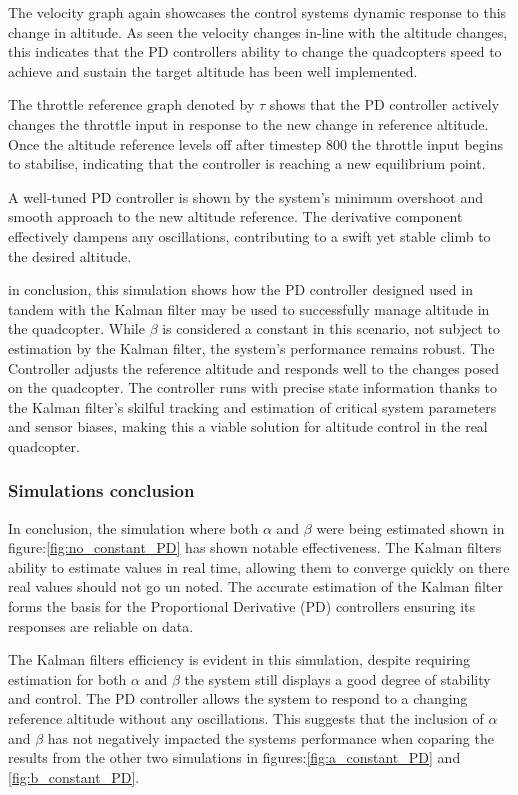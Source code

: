 \documentclass{article}
\begin{document}
The velocity graph again showcases the control systems dynamic response to this
change in altitude. As seen the velocity changes in-line with the altitude
changes, this indicates that the PD controllers ability to change the
quadcopters speed to achieve and sustain the target altitude has been well
implemented.

The throttle reference graph denoted by \(\tau\) shows that the PD controller
actively changes the throttle input in response to the new change in reference
altitude. Once the altitude reference levels off after timestep 800 the throttle
input begins to stabilise, indicating that the controller is reaching a new
equilibrium point.
 
A well-tuned PD controller is shown by the system's minimum overshoot and smooth
approach to the new altitude reference. The derivative component effectively
dampens any oscillations, contributing to a swift yet stable climb to the
desired altitude.

in conclusion, this simulation shows how the PD controller designed used in
tandem with the Kalman filter may be used to successfully manage altitude in the
quadcopter. While \(\beta\) is considered a constant in this scenario, not
subject to estimation by the Kalman filter, the system's performance remains
robust. The Controller adjusts the reference altitude and responds well to the
changes posed on the quadcopter. The controller runs with precise state
information thanks to the Kalman filter's skilful tracking and estimation of
critical system parameters and sensor biases, making this a viable solution for
altitude control in the real quadcopter.


\subsubsection*{Simulations conclusion}
In conclusion, the simulation where both \(\alpha\) and \(\beta\) were being
estimated shown in figure:\ref{fig:no_constant_PD} has shown notable
effectiveness. The Kalman filters ability to estimate values in real time,
allowing them to converge quickly on there real values should not go un noted.
The accurate estimation of the Kalman filter forms the basis for the
Proportional Derivative (PD) controllers ensuring its responses are reliable on
data.

The Kalman filters efficiency is evident in this simulation, despite requiring
estimation for both \(\alpha\) and \(\beta\) the system still displays a good
degree of stability and control. The PD controller allows the system to respond
to a changing reference altitude without any oscillations. This suggests that
the inclusion of \(\alpha\) and \(\beta\) has not negatively impacted the
systems performance when coparing the results from the other two simulations in
figures:\ref{fig:a_constant_PD} and \ref{fig:b_constant_PD}.
\end{document}
